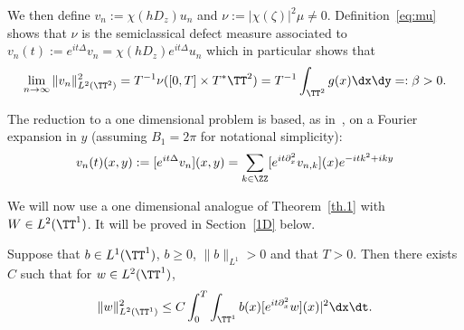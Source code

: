 We then define $ v_n := \chi (h D_z) u_n $ and $\nu := |\chi (\zeta)|^2 \mu \neq 0 $. Definition~\eqref{eq:mu} shows that $ \nu $ is the semiclassical defect measure associated to $ v_n (t) := e^{ i t \Delta } v_n = \chi (h D_z) e^{ it \Delta } u_n $ which in particular shows that
\begin{equation}\label{eq:beta}
\lim_{n\to \infty} \| v_n \|_{ L^2 (\TT^2) }^2 = T^{-1} \nu ([0, T] \times T^* \TT^2) = T^{-1} \int_{ \TT^2 } g (x) \dx \dy =: \beta > 0.
\end{equation}

The reduction to a one dimensional problem is based, as in~\cite{BZ4}, on a Fourier expansion in $ y $ (assuming $ B_1 = 2 \pi $ for notational simplicity):
\begin{equation}\label{eq:Four}
v_n (t) (x, y) := [e^{ i t \Delta } v_n] (x, y) =
\sum_{ k \in \ZZ } [e^{ i t \partial_x^2 } v_{n, k }] (x) e^{-it k^2 + i ky }
\end{equation}

We will now use a one dimensional analogue of Theorem~\ref{th.1} with $ W \in L^2 (\TT^1) $. It will be proved in Section~\ref{1D} below.
\begin{lemm}\label{l:3}
Suppose that $ b \in L^1 (\TT^1) $, $ b\geq 0 $, $\| b \|_{ L^1 } > 0 $ and that $ T > 0 $. Then there exists $ C $ such that for $ w \in L^2 (\TT^1) $,
\begin{equation}\label{eq:l3}
\| w \|_{L^2 (\TT^1) }^2 \leq C \int_0^T \int_{\TT^1} b (x) [e^{ i t \partial_x^2} w](x)|^2 \dx \dt.
\end{equation}
\end{lemm}

